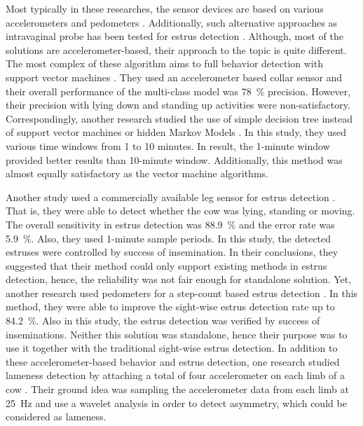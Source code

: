 \documentclass[english,12pt,a4paper,pdftex,elec,utf8]{aaltothesis}
\begin{document}
Most typically in these researches, the sensor devices are based on various accelerometers \cite{Martiskainen200932} \cite{VazquezDiosdado2015} \cite{Jonsson20116} \cite{Pastell2009545} and pedometers \cite{BRUNASSI2010}. Additionally, such alternative approaches as intravaginal probe has been tested for estrus detection \cite{A7370219} \cite{Andersson2016101}. Although, most of the solutions are accelerometer-based, their approach to the topic is quite different. The most complex of these algorithm aims to full behavior detection with support vector machines \cite{Martiskainen200932}. They used an accelerometer based collar sensor and their overall performance of the multi-class model was \SI{78}{\percent} precision. However, their precision with lying down and standing up activities were non-satisfactory. Correspondingly, another research studied the use of simple decision tree instead of support vector machines or hidden Markov Models \cite{VazquezDiosdado2015}. In this study, they used various time windows from 1 to 10 minutes. In result, the 1-minute window provided better results than 10-minute window. Additionally, this method was almost equally satisfactory as the vector machine algorithms.

Another study used a commercially available leg sensor for estrus detection \cite{Jonsson20116}. That is, they were able to detect whether the cow was lying, standing or moving. The overall sensitivity in estrus detection was \SI{88.9}{\percent} and the error rate was \SI{5.9}{\percent}. Also, they used 1-minute sample periods. In this study, the detected estruses were controlled by success of insemination. In their conclusions, they suggested that their method could only support existing methods in estrus detection, hence, the reliability was not fair enough for standalone solution. Yet, another research used pedometers for a step-count based estrus detection \cite{BRUNASSI2010}. In this method, they were able to improve the sight-wise estrus detection rate up to \SI{84.2}{\percent}. Also in this study, the estrus detection was verified by success of inseminations. Neither this solution was standalone, hence their purpose was to use it together with the traditional sight-wise estrus detection. In addition to these accelerometer-based behavior and estrus detection, one research studied lameness detection by attaching a total of four accelerometer on each limb of a cow \cite{Pastell2009545}. Their ground idea was sampling the accelerometer data from each limb at \SI{25}{\hertz} and use a wavelet analysis in order to detect asymmetry, which could be considered as lameness.
\end{document}

